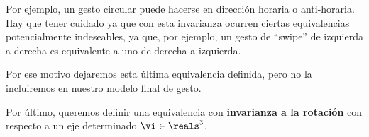  
Por ejemplo, un gesto circular puede hacerse en dirección horaria o anti-horaria. Hay que tener cuidado ya que con esta invarianza ocurren ciertas equivalencias potencialmente indeseables, ya que, por ejemplo, un gesto de ``swipe'' de izquierda a derecha es equivalente a uno de derecha a izquierda.

Por ese motivo dejaremos esta última equivalencia definida, pero no la incluiremos en nuestro modelo final de gesto.


Por último, queremos definir una equivalencia con \textbf{invarianza a la rotación} con respecto a un eje determinado $\vi \in \reals^3$. 




%
%
%
%

